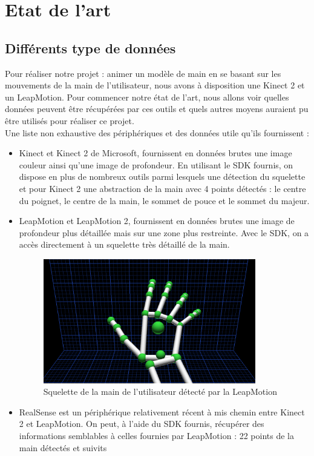 \chapter{Etat de l'art}

\section{Différents type de données}
Pour réaliser notre projet : animer un modèle de main en se basant sur les mouvements de la main de l'utilisateur, nous avons à disposition une 
Kinect 2 et un LeapMotion. Pour commencer notre état de l'art, nous allons voir quelles données peuvent être récupérées par ces outils et 
quels autres moyens auraient pu être utilisés pour réaliser ce projet.\\

Une liste non exhaustive des périphériques et des données utile qu'ils fournissent : 
\begin{itemize}
  \item Kinect et Kinect 2 de Microsoft, fournissent en données brutes une image couleur ainsi qu'une image de profondeur. 
En utilisant le SDK fournis, on dispose en plus de nombreux outils parmi lesquels une détection du squelette et pour Kinect 2 
une abstraction de la main avec 4 points détectés : le centre du poignet, le centre de la main, le sommet de pouce et le sommet du majeur. 
  \item LeapMotion et LeapMotion 2, fournissent en données brutes une image de profondeur plus détaillée mais sur une zone 
plus restreinte. Avec le SDK, on a accès directement à un squelette très détaillé de la main.
    \begin{figure}[!h]
    \center
    \includegraphics[width=350px]{images/SDK_LeapMotion.png}
    \caption{Squelette de la main de l'utilisateur détecté par la LeapMotion}
    \end{figure}
  \item RealSense est un périphérique relativement récent à mis chemin entre Kinect 2 et LeapMotion. On peut, à l'aide du SDK fournis, récupérer des informations semblables à celles fournies par LeapMotion : 
  22 points de la main détectés et suivits
\end{itemize}
